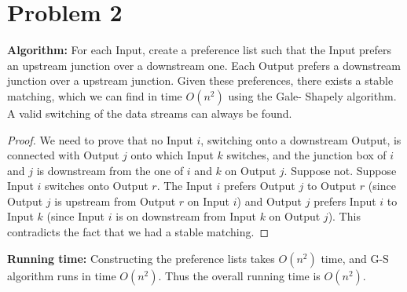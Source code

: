 \documentclass[12pt,letterpaper]{article}
\begin{document}
\section*{Problem 2}

\textbf{Algorithm:} For each Input, create a preference list such that the Input
prefers an upstream junction over a downstream one. Each Output prefers a 
downstream junction over a upstream junction. Given these preferences, there
exists a stable matching, which we can find in time $O(n^2)$ using the Gale-
Shapely algorithm. A valid switching of the data streams can always be found.

\begin{proof}
We need to prove that no Input $i$, switching onto a downstream Output, is 
connected with Output $j$ onto which Input $k$ switches, and the junction 
box of $i$ and $j$ is downstream from the one of $i$ and $k$ on Output $j$.
Suppose not. Suppose Input $i$ switches onto Output $r$. The Input $i$ prefers Output $j$ to Output $r$ (since Output $j$ is upstream from Output $r$ on 
Input $i$) and Output $j$ prefers Input $i$ to Input $k$ (since Input $i$ is on
downstream from Input $k$ on Output $j$). This contradicts the fact that we 
had a stable matching.
\end{proof}

\textbf{Running time:} Constructing the preference lists takes $O(n^2)$ time,
and G-S algorithm runs in time $O(n^2)$. Thus the overall running time is 
$O(n^2)$.
\end{document}
